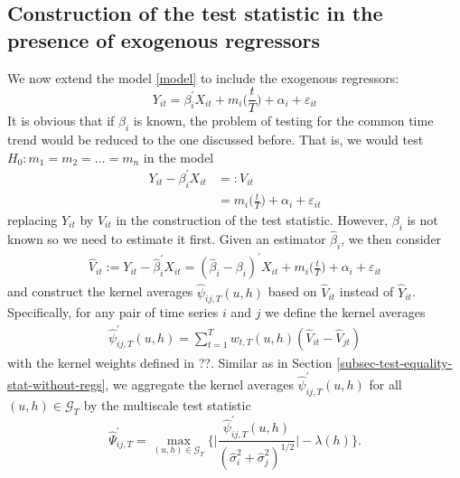 %
%

\subsection{Construction of the test statistic in the presence of exogenous regressors}\label{subsec-test-equality-stat-with-regs}

We now extend the model \eqref{model} to include the exogenous regressors:
\begin{equation}
Y_{it} = \beta_i^\prime X_{it} + m_i \Big( \frac{t}{T} \Big) + \alpha_i + \varepsilon_{it} 
\end{equation}
It is obvious that if $\beta_i$ is known, the problem of testing for the common time trend would be reduced to the one discussed before. That is, we would test $H_0: m_1 = m_2 = \ldots = m_n$ in the model
\begin{align*}
Y_{it} - \beta_i^\prime X_{it} & =: V_{it}\\
					& = m_i \Big( \frac{t}{T} \Big) + \alpha_i + \varepsilon_{it} 
\end{align*}
replacing $Y_{it}$ by $V_{it}$ in the construction of the test statistic. However, $\beta_i$ is not known so we need to estimate it first. Given an estimator $\widehat{\beta}_i$, we then consider
\begin{align*}
	\widehat{V}_{it} := Y_{it} - \widehat{\beta}_i^\prime X_{it} =(\widehat{\beta}_i - \beta_i)^\prime X_{it} + m_i \Big( \frac{t}{T} \Big) + \alpha_i + \varepsilon_{it} 
\end{align*}
and construct the kernel averages $\widehat{\psi}_{ij, T}(u, h)$ based on $\widehat{V}_{it}$ instead of $\widehat{Y}_{it}$. Specifically, for any pair of time series $i$ and $j$ we define the kernel averages
\begin{align*}
	\widehat{\psi}^{\prime}_{ij, T}(u, h) = \sum_{t=1}^T w_{t, T}(u, h)(\widehat{V}_{it} - \widehat{V}_{jt})
\end{align*}
with the kernel weights defined in ??. Similar as in Section \ref{subsec-test-equality-stat-without-regs}, we aggregate the kernel averages $\widehat{\psi}^{\prime}_{ij, T}(u, h)$ for all $(u, h)\in \mathcal{G}_T$ by the multiscale test statistic
\[ \widehat{\Psi}^\prime_{ij,T} = \max_{(u,h) \in \mathcal{G}_T} \Big\{ \Big|\frac{\widehat{\psi}^\prime_{ij,T}(u,h)}{(\widehat{\sigma}_i^2 + \widehat{\sigma}_j^2)^{1/2}}\Big| - \lambda(h) \Big\}. \]

